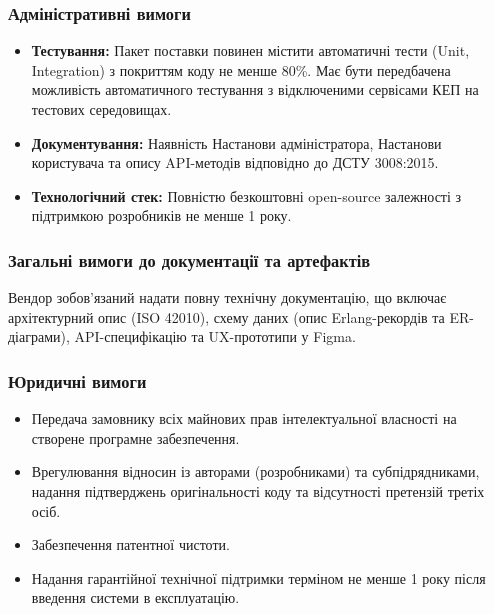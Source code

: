 \documentclass{article}
\begin{document}
\subsubsection{Адміністративні вимоги}
\begin{itemize}
    \item \textbf{Тестування:} Пакет поставки повинен містити автоматичні тести (Unit, Integration) з покриттям коду не менше 80\%. Має бути передбачена можливість автоматичного тестування з відключеними сервісами КЕП на тестових середовищах.
    \item \textbf{Документування:} Наявність Настанови адміністратора, Настанови користувача та опису API-методів відповідно до ДСТУ 3008:2015.
    \item \textbf{Технологічний стек:} Повністю безкоштовні open-source залежності з підтримкою розробників не менше 1 року.
\end{itemize}

\subsubsection{Загальні вимоги до документації та артефактів}
Вендор зобов'язаний надати повну технічну документацію, що включає архітектурний опис (ISO 42010), схему даних (опис Erlang-рекордів та ER-діаграми), API-специфікацію та UX-прототипи у Figma.

\subsubsection{Юридичні вимоги}
\begin{itemize}
    \item Передача замовнику всіх майнових прав інтелектуальної власності на створене програмне забезпечення.
    \item Врегулювання відносин із авторами (розробниками) та субпідрядниками, надання підтверджень оригінальності коду та відсутності претензій третіх осіб.
    \item Забезпечення патентної чистоти.
    \item Надання гарантійної технічної підтримки терміном не менше 1 року після введення системи в експлуатацію.
\end{itemize}
\end{document}

